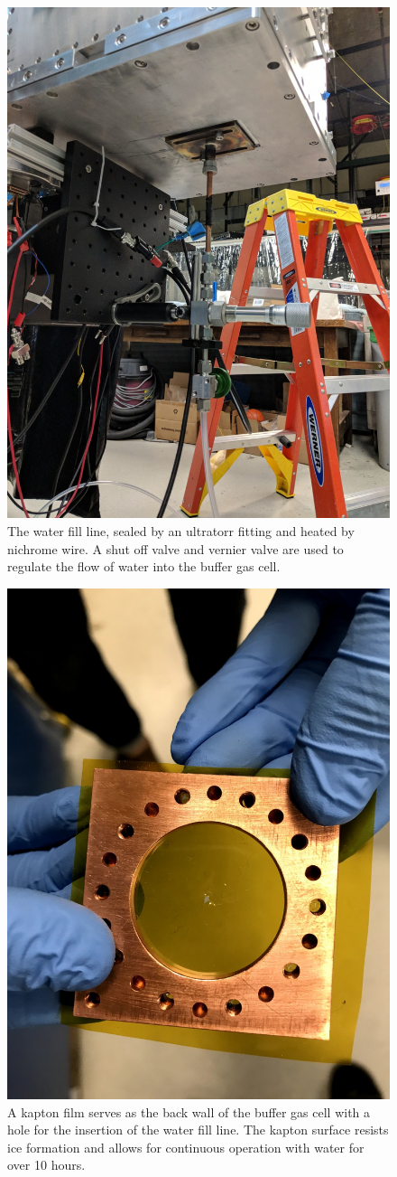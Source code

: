 \begin{figure}[H]
\centering
\includegraphics[width=.7\textwidth]{images/apparatus_water_fill_outside.jpg}
\caption{The water fill line, sealed by an ultratorr fitting and heated by nichrome wire. A shut off valve and vernier valve are used to regulate the flow of water into the buffer gas cell.}
\label{f: outside}
\end{figure}

\begin{figure}[H]
\centering
\includegraphics[width=.7\textwidth]{images/apparatus_kapton.jpg}
\caption{A kapton film serves as the back wall of the buffer gas cell with a hole for the insertion of the water fill line. The kapton surface resists ice formation and allows for continuous operation with water for over 10 hours.}
\label{f: kapton}
\end{figure}

